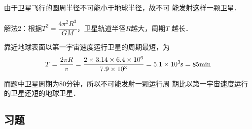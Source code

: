 \begin{enumerate}
\begin{solution}
由于卫星飞行的圆周半径不可能小于地球半径，故不可
能发射这样一颗卫星．

解法2：根据$T^2=\dfrac{4\pi^2R^3}{GM}$，卫星轨道半径$R$越大，周期$T$
越长．

靠近地球表面以第一宇宙速度运行卫星的周期最短，为
\[T=\frac{2\pi R}{v}=\frac{2\times 3.14\times 6.4\times 10^{6}}{7.9\times 10^3}=5.1\times 10^3{\rm s}=85{\rm min}\]

而题中卫星周期为80分钟，所以不可能发射一颗运行周
期比以第一宇宙速度运行的卫星还短的地球卫星．
\end{solution}

\end{enumerate}





\subsection{习题}
